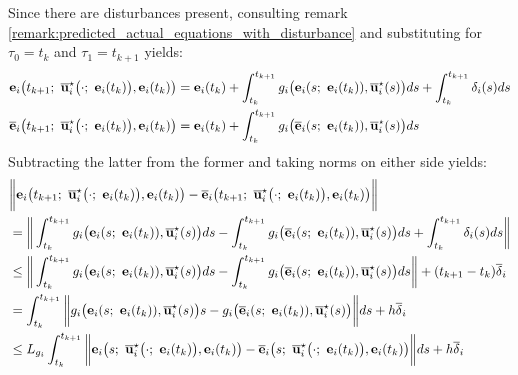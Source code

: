 \begin{gg_box}

Since there are disturbances present, consulting remark
\eqref{remark:predicted_actual_equations_with_disturbance} and substituting
for $\tau_0 = t_k$ and $\tau_1 = t_{k+1}$ yields:
\begin{align}
  \vect{e}_i\big(t_{k+1};\ \overline{\vect{u}}_i^{\star}\big(\cdot;\ \vect{e}_i(t_k)\big), \vect{e}_i(t_k)\big) &=
    \vect{e}_i(t_k)
    + \int_{t_k}^{t_{k+1}} g_i\big(\vect{e}_i(s;\ \vect{e}_i(t_k)), \overline{\vect{u}}_i^{\star}(s)\big) ds
    + \int_{t_k}^{t_{k+1}}\delta_i(s)ds\\
  \overline{\vect{e}}_i\big(t_{k+1};\ \overline{\vect{u}}_i^{\star}\big(\cdot;\ \vect{e}_i(t_k)\big), \vect{e}_i(t_k)\big) &=
    \vect{e}_i(t_k) + \int_{t_k}^{t_{k+1}} g_i\big(\overline{\vect{e}}_i(s;\ \vect{e}_i(t_k)), \overline{\vect{u}}_i^{\star}(s)\big) ds
\end{align}
Subtracting the latter from the former and taking norms on either side yields:
\begin{align}
  &\bigg\| \vect{e}_i\big(t_{k+1};\ \overline{\vect{u}}_i^{\star}\big(\cdot;\ \vect{e}_i(t_k)\big), \vect{e}_i(t_k)\big) -
  \overline{\vect{e}}_i\big(t_{k+1};\ \overline{\vect{u}}_i^{\star}\big(\cdot;\ \vect{e}_i(t_k)\big), \vect{e}_i(t_k)\big) \bigg\| \\
  &=\bigg\| \int_{t_k}^{t_{k+1}} g_i\big(\vect{e}_i(s;\ \vect{e}_i(t_k)), \overline{\vect{u}}_i^{\star}(s)\big) ds
     - \int_{t_k}^{t_{k+1}} g_i\big(\overline{\vect{e}}_i(s;\ \vect{e}_i(t_k)), \overline{\vect{u}}_i^{\star}(s)\big) ds
    + \int_{t_k}^{t_{k+1}}\delta_i(s)ds \bigg\| \\
  & \leq \bigg\| \int_{t_k}^{t_{k+1}} g_i\big(\vect{e}_i(s;\ \vect{e}_i(t_k)), \overline{\vect{u}}_i^{\star}(s)\big) ds
     - \int_{t_k}^{t_{k+1}} g_i\big(\overline{\vect{e}}_i(s;\ \vect{e}_i(t_k)), \overline{\vect{u}}_i^{\star}(s)\big) ds \bigg\|
     + (t_{k+1} - t_k)\overline{\delta}_i \\
  &=
     \int_{t_k}^{t_{k+1}} \bigg\| g_i\big(\vect{e}_i(s;\ \vect{e}_i(t_k)), \overline{\vect{u}}_i^{\star}(s)\big)s
     - g_i\big(\overline{\vect{e}}_i(s;\ \vect{e}_i(t_k)), \overline{\vect{u}}_i^{\star}(s)\big) \bigg\| ds + h \overline{\delta}_i\\
  &\leq L_{g_i} \int_{t_k}^{t_{k+1}} \bigg\| \vect{e}_i\big(s;\ \overline{\vect{u}}_i^{\star}\big(\cdot;\ \vect{e}_i(t_k)\big), \vect{e}_i(t_k)\big) -
  \overline{\vect{e}}_i\big(s;\ \overline{\vect{u}}_i^{\star}\big(\cdot;\ \vect{e}_i(t_k)\big), \vect{e}_i(t_k)\big) \bigg\| ds + h \overline{\delta}_i  \\

\end{align}
\end{gg_box}
